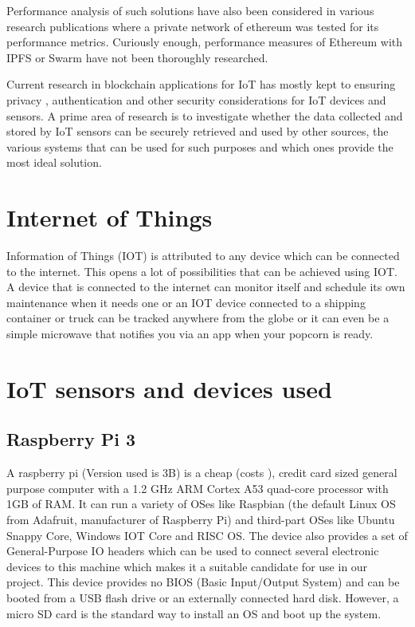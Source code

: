 \documentclass[11pt,openright]{report}
\begin{document}
Performance analysis of such solutions have also been considered in various research publications \cite{8342866} where a private network of ethereum was tested for its performance metrics. Curiously enough, performance measures of Ethereum with IPFS or Swarm have not been thoroughly researched. 

Current research in blockchain applications for IoT has mostly kept to ensuring privacy , authentication and other security considerations \cite{8012302} for IoT devices and sensors.
A prime area of research is to investigate whether the data collected and stored by IoT sensors can be securely retrieved and used by other sources, the various systems that can be used for such purposes and which ones provide the most ideal solution.


\section{Internet of Things}
Information of Things (IOT) is attributed to any device which can be connected to the internet. This opens a lot of possibilities that can be achieved using IOT. A device that is connected to the internet can monitor itself and schedule its own maintenance when it needs one or an IOT device connected to a shipping container or truck can be tracked anywhere from the globe or it can even be a simple microwave that notifies you via an app when your popcorn is ready.

\section{IoT sensors and devices used}
\subsection{Raspberry Pi 3}
A raspberry pi (Version used is 3B) is a cheap (costs ), credit card sized general purpose computer with a 1.2 GHz ARM Cortex A53 quad-core processor with 1GB of RAM. It can run a variety of OSes like Raspbian (the default Linux OS from Adafruit, manufacturer of Raspberry Pi) and third-part OSes like Ubuntu Snappy Core, Windows IOT Core and RISC OS. The device also provides a set of General-Purpose IO headers which can be used to connect several electronic devices to this machine which makes it a suitable candidate for use in our project. This device provides no BIOS (Basic Input/Output System) and can be booted from a USB flash drive or an externally connected hard disk. However, a micro SD card is the standard way to install an OS and boot up the system.  
\end{document}
